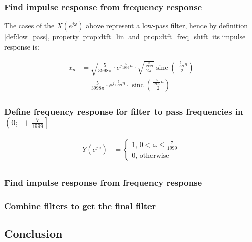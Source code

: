 \documentclass[a4paper]{article}
\theoremstyle{break}
\theoremstyle{break}
\DeclareMathOperator{\sinc}{sinc}
\begin{document}
\subsubsection*{Find impulse response from frequency response}

The cases of the $X(e^{j \omega})$ above represent a low-pass filter, hence by definition \ref{def:low_pass}, property \ref{prop:dtft_lin} and \ref{prop:dtft_freq_shift} its impulse response is:

\begin{equation*}
  \begin{split}
    x_n &= \sqrt{\frac{5}{3998 \pi}} \cdot e^{j \frac{5}{1999} n} \cdot \sqrt{\frac{\frac{5}{1999}}{2 \pi}} \sinc \left( \frac{\frac{5}{1999} n} {2} \right) \\
        &= \frac{5}{3998 \pi} \cdot e^{j \frac{5}{1999} n} \cdot \sinc \left( \frac{\frac{5}{1999} n} {2} \right)
  \end{split}
\end{equation*}

\subsubsection*{Define frequency response for filter to pass frequencies in $\left( 0; \; +\frac{7}{1999} \right]$}

\begin{equation*}
  \begin{split}
    Y(e^{j \omega}) &= \begin{cases}
                         1, \, 0 < \omega \leq \frac{7}{1999} \\
                         0, \, \text{otherwise}
                       \end{cases} \\
  \end{split}
\end{equation*}

\subsubsection*{Find impulse response from frequency response}


\subsubsection*{Combine filters to get the final filter}


\subsection*{Conclusion}

\end{document}
